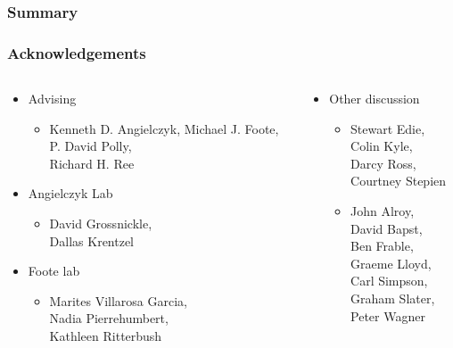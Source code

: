 \documentclass{beamer}
\begin{document}
%
%
\begin{frame}
  \frametitle{Summary}
\end{frame}

\begin{frame}
  \frametitle{Acknowledgements}
  \begin{columns}
    \begin{column}{0.5\textwidth}
      \begin{itemize}
        \item Advising
          \begin{itemize}
            \item Kenneth D. Angielczyk, Michael J. Foote, \\P. David Polly, \\Richard H. Ree
          \end{itemize}
        \item Angielczyk Lab
          \begin{itemize}
            \item David Grossnickle, \\Dallas Krentzel
          \end{itemize}
        \item Foote lab
          \begin{itemize}
            \item Marites Villarosa Garcia, \\Nadia Pierrehumbert, \\Kathleen Ritterbush
          \end{itemize}
      \end{itemize}
    \end{column}
    \begin{column}{0.5\textwidth}
      \begin{itemize}
        \item Other discussion
          \begin{itemize}
            \item Stewart Edie, \\Colin Kyle, \\Darcy Ross, \\Courtney Stepien
            \item John Alroy, \\David Bapst, \\Ben Frable, \\Graeme Lloyd, \\Carl Simpson, \\Graham Slater, \\Peter Wagner
          \end{itemize}
      \end{itemize}
    \end{column}
  \end{columns}
\end{frame}
\end{document}
